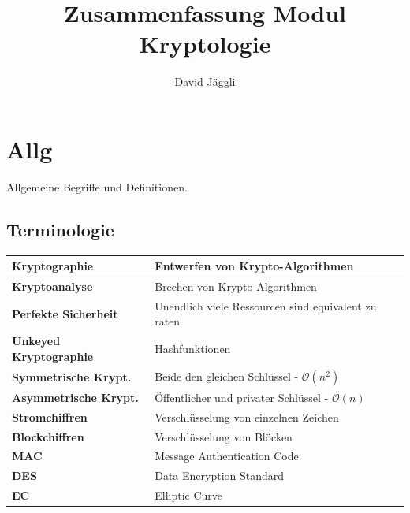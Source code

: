 \documentclass[12pt]{scrartcl}
\author{David Jäggli}
\title{Zusammenfassung Modul Kryptologie}
\begin{document}
\maketitle

\tableofcontents

\newpage
\section{Allg}

Allgemeine Begriffe und Definitionen.


\subsection{Terminologie}


\renewcommand{\arraystretch}{1.5}
\begin{center}
    \begin{tabular}{ | m{12em} | m{25em} | }
        \hline
        \textbf{Kryptographie}          & Entwerfen von Krypto-Algorithmen                          \\
        \hline
        \textbf{Kryptoanalyse}          & Brechen von Krypto-Algorithmen                            \\
        \hline
        \textbf{Perfekte Sicherheit}    & Unendlich viele Ressourcen sind equivalent zu raten       \\
        \hline
        \textbf{Unkeyed Kryptographie}  & Hashfunktionen                                            \\
        \hline
        \textbf{Symmetrische Krypt.}    & Beide den gleichen Schlüssel - $\mathcal{O}(n^2)$         \\
        \hline
        \textbf{Asymmetrische Krypt.}   & Öffentlicher und privater Schlüssel - $\mathcal{O}(n)$    \\
        \hline
        \textbf{Stromchiffren}          & Verschlüsselung von einzelnen Zeichen                     \\
        \hline
        \textbf{Blockchiffren}          & Verschlüsselung von Blöcken                               \\
        \hline
        \textbf{MAC}                    & Message Authentication Code                               \\
        \hline
        \textbf{DES}                    & Data Encryption Standard                                  \\
        \hline
        \textbf{EC}                     & Elliptic Curve                                            \\

\end{tabular}
\end{center}
\end{document}
